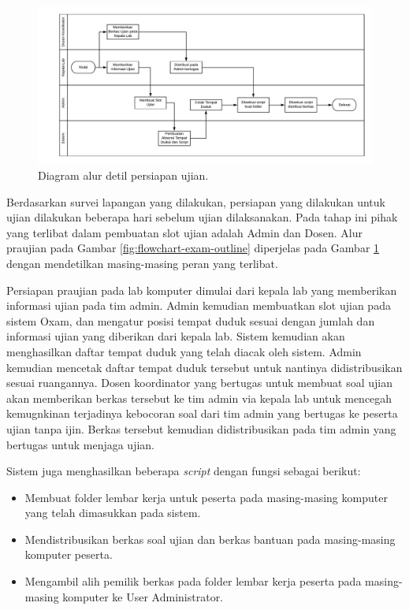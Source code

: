         \begin{figure}
            \centering
            \includegraphics[width=0.75\paperheight]{Gambar/flowchart/exam-flow-ujian-pra.pdf}
            \caption{Diagram alur detil persiapan ujian.}
            \label{fig:flowchart-exam-preexam}
        \end{figure}
        
        Berdasarkan survei lapangan yang dilakukan, persiapan yang dilakukan
        untuk ujian dilakukan beberapa hari sebelum ujian dilaksanakan. Pada
        tahap ini pihak yang terlibat dalam pembuatan slot ujian adalah Admin
        dan Dosen. Alur praujian pada Gambar \ref{fig:flowchart-exam-outline}
        diperjelas pada Gambar \ref{fig:flowchart-exam-preexam} dengan
        mendetilkan masing-masing peran yang terlibat.
        
        Persiapan praujian pada lab komputer dimulai dari kepala lab yang memberikan
        informasi ujian pada tim admin.
        Admin kemudian membuatkan slot ujian pada sistem Oxam, dan mengatur posisi
        tempat duduk sesuai dengan jumlah dan informasi ujian yang diberikan
        dari kepala lab. Sistem kemudian akan menghasilkan daftar tempat duduk
        yang telah diacak oleh sistem. Admin kemudian mencetak daftar tempat
        duduk tersebut untuk nantinya didistribusikan sesuai ruangannya. Dosen
        koordinator yang bertugas untuk membuat soal ujian akan memberikan
        berkas tersebut ke tim admin via kepala lab untuk mencegah kemugnkinan terjadinya
        kebocoran soal dari tim admin yang bertugas ke peserta ujian tanpa ijin. Berkas
        tersebut kemudian didistribusikan pada tim admin yang bertugas untuk menjaga ujian.
        
        Sistem juga menghasilkan beberapa \textit{script} dengan fungsi sebagai
        berikut:
        \begin{itemize}
            \item Membuat folder lembar kerja untuk peserta pada masing-masing
                komputer yang telah dimasukkan pada sistem.
            \item Mendistribusikan berkas soal ujian dan berkas bantuan pada
                masing-masing komputer peserta.
            \item Mengambil alih pemilik berkas pada folder lembar kerja peserta
                pada masing-masing komputer ke User Administrator.
        \end{itemize}
        
